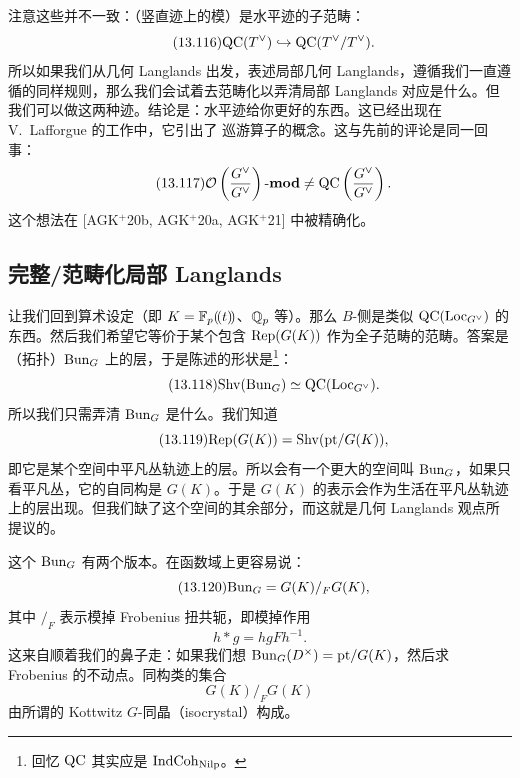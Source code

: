 注意这些并不一致：（竖直迹上的模）是水平迹的子范畴：
\begin{equation}\tag{13.116}
\mathrm{QC}(T^\vee)\hookrightarrow\mathrm{QC}(T^\vee/T^\vee).
\end{equation}
所以如果我们从几何 Langlands 出发，表述局部几何 Langlands，遵循我们一直遵循的同样规则，那么我们会试着去范畴化以弄清局部 Langlands 对应是什么。但我们可以做这两种迹。结论是：水平迹给你更好的东西。这已经出现在 V.~Lafforgue 的工作中，它引出了 巡游算子的概念。这与先前的评论是同一回事：
\begin{equation}\tag{13.117}
\mathcal{O}\left(\frac{G^\vee}{G^\vee}\right)\text{-}\mathbf{mod}\neq \mathrm{QC}\left(\frac{G^\vee}{G^\vee}\right).
\end{equation}
这个想法在 [AGK$^+$20b, AGK$^+$20a, AGK$^+$21] 中被精确化。

\subsection{完整/范畴化局部 Langlands}\label{sec:13-6-4}

让我们回到算术设定（即 $K=\mathbb{F}_p(\!(t)\!)$、$\mathbb{Q}_p$ 等）。那么 $B$-侧是类似 $\mathrm{QC}(\mathrm{Loc}_{G^\vee})$ 的东西。然后我们希望它等价于某个包含 $\mathrm{Rep}(G(K))$ 作为全子范畴的范畴。答案是（拓扑）$\mathrm{Bun}_G$ 上的层，于是陈述的形状是\footnote{回忆 $\mathrm{QC}$ 其实应是 $\mathrm{IndCoh}_{\mathrm{Nilp}}$。}：
\begin{equation}\tag{13.118}
\mathrm{Shv}(\mathrm{Bun}_G)\simeq\mathrm{QC}(\mathrm{Loc}_{G^\vee}).
\end{equation}
所以我们只需弄清 $\mathrm{Bun}_G$ 是什么。我们知道
\begin{equation}\tag{13.119}
\mathrm{Rep}(G(K))=\mathrm{Shv}(\mathrm{pt}/G(K)),
\end{equation}
即它是某个空间中平凡丛轨迹上的层。所以会有一个更大的空间叫 $\mathrm{Bun}_G$，如果只看平凡丛，它的自同构是 $G(K)$。于是 $G(K)$ 的表示会作为生活在平凡丛轨迹上的层出现。但我们缺了这个空间的其余部分，而这就是几何 Langlands 观点所提议的。

这个 $\mathrm{Bun}_G$ 有两个版本。在函数域上更容易说：
\begin{equation}\tag{13.120}
\mathrm{Bun}_G=G(K)/_F G(K),
\end{equation}
其中 $/_F$ 表示模掉 Frobenius 扭共轭，即模掉作用
\begin{equation}\tag{13.121}
h*g=hgFh^{-1}.
\end{equation}
这来自顺着我们的鼻子走：如果我们想 $\mathrm{Bun}_G(D^\times)=\mathrm{pt}/G(K)$，然后求 Frobenius 的不动点。同构类的集合
\begin{equation}\tag{13.122}
G(K)/_FG(K)
\end{equation}
由所谓的 Kottwitz $G$-同晶（isocrystal）构成。

